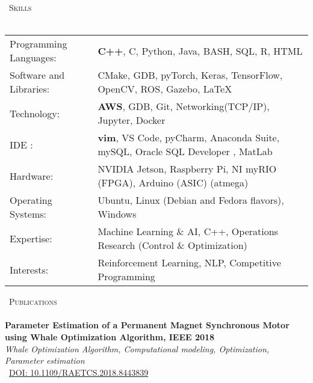 \documentclass{article}
\newcommand{\lineunder} {
    \vspace*{-8pt} \\
    \hspace*{-18pt} \hrulefill \\
}
\newcommand{\header} [1] {
    {\hspace*{-18pt}\vspace*{6pt} \textsc{#1}}
    \vspace*{-6pt} \lineunder
}
\begin{document}
\header{\faTasks\ Skills}
\begin{tabular}{ l l }
	Programming Languages:  & \textbf{C++}, C, Python, Java, BASH, SQL, R, HTML                                    \\
	Software and Libraries: & CMake, GDB, pyTorch, Keras, TensorFlow, OpenCV, ROS, Gazebo, \LaTeX                      \\
	Technology:             & \textbf{AWS}, GDB, Git, Networking(TCP/IP),  Jupyter, Docker                                \\
	IDE :                   & \textbf{vim}, VS Code, pyCharm, Anaconda Suite, mySQL, Oracle SQL Developer , MatLab            \\
	Hardware:               & NVIDIA Jetson, Raspberry Pi, NI myRIO (FPGA), Arduino (ASIC) (atmega) \\
	Operating Systems:      & Ubuntu, Linux (Debian and Fedora flavors),  Windows                    \\
	Expertise:              & Machine Learning \& AI, C++, Operations Research (Control \& Optimization)     \\
	Interests:              & Reinforcement Learning, NLP, Competitive Programming     \\
\end{tabular}
\vspace{2mm}


\header{\faPrint\ Publications}
{\textbf{Parameter Estimation of a Permanent Magnet Synchronous Motor using Whale Optimization Algorithm, IEEE 2018}}
\\{\sl Whale Optimization Algorithm, Computational modeling, Optimization,
Parameter estimation} \\
{ \faLink\ \href{https://doi.org/10.1109/RAETCS.2018.8443839}{DOI: 10.1109/RAETCS.2018.8443839}}
\vspace*{3mm}

\end{document}
